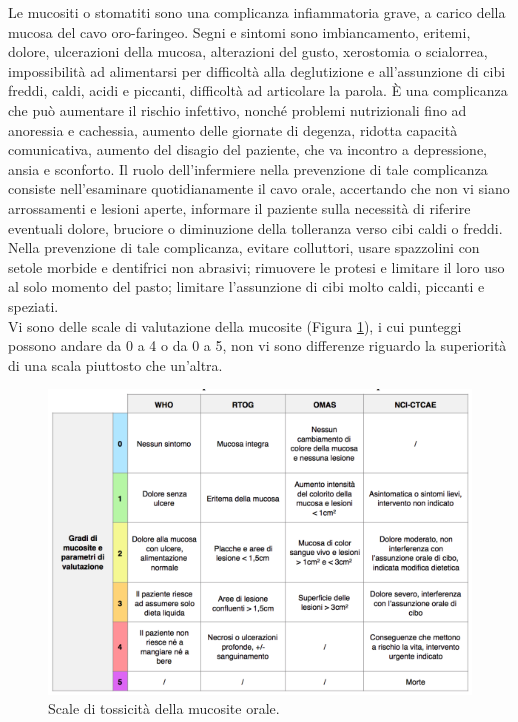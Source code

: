 Le mucositi o stomatiti sono una complicanza infiammatoria grave, a carico della mucosa del cavo oro-faringeo. 
Segni e sintomi sono imbiancamento, eritemi, dolore, ulcerazioni della mucosa, alterazioni del gusto, xerostomia o 
scialorrea, impossibilità ad alimentarsi per difficoltà alla deglutizione e all’assunzione di cibi freddi, caldi, 
acidi e piccanti, difficoltà ad articolare la parola. È una complicanza che può aumentare il rischio infettivo, 
nonché problemi nutrizionali fino ad anoressia e cachessia, aumento delle giornate di degenza, ridotta capacità 
comunicativa, aumento del disagio del paziente, che va incontro a depressione, ansia e sconforto\cite{mucositi}. 
Il ruolo dell’infermiere nella prevenzione di tale complicanza consiste nell’esaminare quotidianamente il cavo orale, 
accertando che non vi siano arrossamenti e lesioni aperte, informare il paziente sulla necessità di riferire 
eventuali dolore, bruciore o diminuzione della tolleranza verso cibi caldi o freddi. Nella prevenzione di tale 
complicanza, evitare colluttori, usare spazzolini con setole morbide e dentifrici non abrasivi; rimuovere le 
protesi e limitare il loro uso al solo momento del pasto; limitare l'assunzione di cibi molto caldi, 
piccanti e speziati\cite{mucositi}.\\ 
Vi sono delle scale di valutazione della mucosite (Figura \ref{fig:FIGURE_4.2}), i cui punteggi possono andare da 0 a 4 o 
da 0 a 5, non vi sono differenze riguardo la superiorità di una scala piuttosto che un’altra\cite{SCALEmucositi}.\\

\begin{figure}[H]
    \begin{center}
    \includegraphics[width=0.7\columnwidth]{img/SCALEMUCOSITI.png}
    \end{center}
    \caption{Scale di tossicità della mucosite orale.
    \cite{SCALEmucositi}}
    \label{fig:FIGURE_4.2}
\end{figure}

